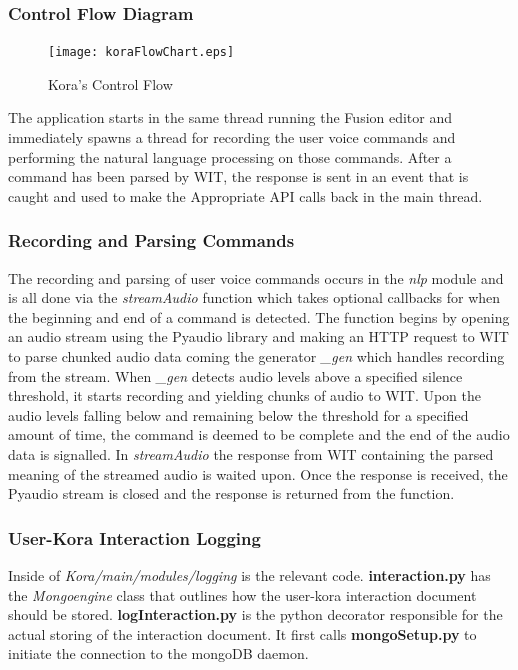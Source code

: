 \documentclass[onecolumn, draftclsnofoot,10pt, compsoc]{IEEEtran}
\begin{document}
\subsubsection{Control Flow Diagram}
	\begin{figure}[H]
		\texttt{[image: koraFlowChart.eps]}
		\centering
		\caption{Kora's Control Flow}
	\end{figure}
The application starts in the same thread running the Fusion editor and immediately spawns a thread for recording the user voice commands and performing the natural language processing on those commands.
After a command has been parsed by WIT, the response is sent in an event that is caught and used to make the Appropriate API calls back in the main thread.
	
\subsubsection{Recording and Parsing Commands} 
The recording and parsing of user voice commands occurs in the \textit{nlp} module and is all done via the \textit{streamAudio} function which takes optional callbacks for when the beginning and end of a command is detected.
The function begins by opening an audio stream using the Pyaudio library and making an HTTP request to WIT to parse chunked audio data coming the generator \textit{\_gen} which handles recording from the stream.
When \textit{\_gen} detects audio levels above a specified silence threshold, it starts recording and yielding chunks of audio to WIT.
Upon the audio levels falling below and remaining below the threshold for a specified amount of time, the command is deemed to be complete and the end of the audio data is signalled.
In \textit{streamAudio} the response from WIT containing the parsed meaning of the streamed audio is waited upon. 
Once the response is received, the Pyaudio stream is closed and the response is returned from the function.

\subsubsection{User-Kora Interaction Logging }
Inside of \textit{Kora/main/modules/logging} is the relevant code.
\textbf{interaction.py} has the \textit{Mongoengine} class that outlines how the user-kora interaction document should be stored. \textbf{logInteraction.py} is the python decorator responsible for the actual storing of the interaction document. It first calls \textbf{mongoSetup.py} to initiate the connection to the mongoDB daemon.
\end{document}
